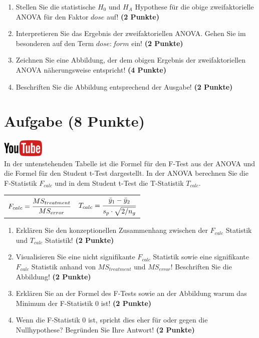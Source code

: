 \documentclass[a4paper, 10pt]{scrartcl}\usepackage[]{graphicx}\usepackage[]{xcolor}
\begin{document}
\begin{enumerate}
\item Stellen Sie die statistische $H_0$ und $H_A$ Hypothese f{\"u}r die obige
  zweifaktorielle ANOVA f{\"u}r den Faktor $dose$
  auf! \textbf{(2 Punkte)}
\item Interpretieren Sie das Ergebnis der zweifaktoriellen ANOVA. Gehen Sie
  im besonderen auf den Term $dose:form$ ein! \textbf{(2 Punkte)}
\item Zeichnen Sie eine Abbildung, der dem obigen Ergebnis der
  zweifaktoriellen ANOVA n{\"a}herungsweise entspricht! \textbf{(4 Punkte)}
\item Beschriften Sie die Abbildung entsprechend der \Rlogo Ausgabe! \textbf{(2 Punkte)}
\end{enumerate}
 
\clearpage

\section{Aufgabe \hfill (8 Punkte)}


\hfill\href{https://youtu.be/FjjJXkFJfIY}{\includegraphics[width =
  2cm]{img/youtube}}\\[1Ex]


In der untenstehenden Tabelle ist die Formel f{\"u}r den F-Test aus der ANOVA
und die Formel f{\"u}r den Student t-Test dargestellt. In der ANOVA berechnen
Sie die F-Statistik $F_{calc}$ und in dem Student t-Test die T-Statistik
$T_{calc}$.

\begin{center}
  \begin{tabular}{cc}
    $F_{calc} = \cfrac{MS_{treatment}}{MS_{error}}$ & $T_{calc} = \cfrac{\bar{y}_1 - \bar{y}_2}{s_p \cdot \sqrt{2/n_g}}$\\
  \end{tabular}
\end{center}


\begin{enumerate}
\item Erkl{\"a}ren Sie den konzeptionellen Zusammenhang zwischen der $F_{calc}$
  Statistik und $T_{calc}$ Statistik! \textbf{(2 Punkte)}
\item Visualisieren Sie eine nicht signifikante $F_{calc}$ Statistik sowie
  eine signifikante $F_{calc}$ Statistik anhand von $MS_{treatment}$ und
  $MS_{error}$! Beschriften Sie die Abbildung! \textbf{(2 Punkte)}
\item Erkl{\"a}ren Sie an der Formel des F-Tests sowie an der Abbildung warum
  das Minimum der F-Statistik 0 ist! \textbf{(2 Punkte)}
\item Wenn die F-Statistik 0 ist, spricht dies eher f{\"u}r oder gegen die
  Nullhypothese? Begr{\"u}nden Sie Ihre Antwort! \textbf{(2 Punkte)}
\end{enumerate}
\end{document}
